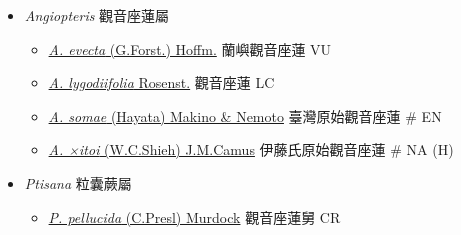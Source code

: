 
  \begin{itemize}
 \item[    ] \textit{Angiopteris} 觀音座蓮屬
                                
  \begin{itemize}
        \item[] \href{http://www.theplantlist.org/tpl1.1/search?q=Angiopteris+evecta}{\textit{A. evecta} (G.Forst.) Hoffm.}   蘭嶼觀音座蓮   VU
        \item[] \href{http://www.theplantlist.org/tpl1.1/search?q=Angiopteris+lygodiifolia}{\textit{A. lygodiifolia} Rosenst.}   觀音座蓮   LC
        \item[] \href{http://www.theplantlist.org/tpl1.1/search?q=Angiopteris+somae}{\textit{A. somae} (Hayata) Makino \& Nemoto}   臺灣原始觀音座蓮  \# EN
        \item[] \href{http://www.theplantlist.org/tpl1.1/search?q=Angiopteris+×itoi}{\textit{A. ×itoi} (W.C.Shieh) J.M.Camus}   伊藤氏原始觀音座蓮  \# NA (H)
  \end{itemize}
 \item[    ] \textit{Ptisana} 粒囊蕨屬
                                
  \begin{itemize}
        \item[] \href{http://www.theplantlist.org/tpl1.1/search?q=Ptisana+pellucida}{\textit{P. pellucida} (C.Presl) Murdock}   觀音座蓮舅   CR
  \end{itemize}
  \end{itemize}
